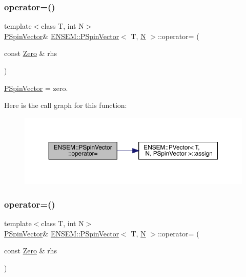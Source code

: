 \subsubsection{\texorpdfstring{operator=()}{operator=()}\hspace{0.1cm}{\footnotesize\ttfamily [1/6]}}
{\footnotesize\ttfamily template$<$class T, int N$>$ \\
\mbox{\hyperlink{classENSEM_1_1PSpinVector}{P\+Spin\+Vector}}\& \mbox{\hyperlink{classENSEM_1_1PSpinVector}{E\+N\+S\+E\+M\+::\+P\+Spin\+Vector}}$<$ T, \mbox{\hyperlink{adat__devel_2lib_2hadron_2operator__name__util_8cc_a7722c8ecbb62d99aee7ce68b1752f337}{N}} $>$\+::operator= (\begin{DoxyParamCaption}\item[{const \mbox{\hyperlink{structENSEM_1_1Zero}{Zero}} \&}]{rhs }\end{DoxyParamCaption})\hspace{0.3cm}{\ttfamily [inline]}}



\mbox{\hyperlink{classENSEM_1_1PSpinVector}{P\+Spin\+Vector}} = zero. 

Here is the call graph for this function\+:
\nopagebreak
\begin{figure}[H]
\begin{center}
\leavevmode
\includegraphics[width=350pt]{d0/dce/classENSEM_1_1PSpinVector_aff99857da5f6f68093f04c9df5355e84_cgraph}
\end{center}
\end{figure}
\mbox{\label{classENSEM_1_1PSpinVector_aff99857da5f6f68093f04c9df5355e84}} 
\subsubsection{\texorpdfstring{operator=()}{operator=()}\hspace{0.1cm}{\footnotesize\ttfamily [2/6]}}
{\footnotesize\ttfamily template$<$class T, int N$>$ \\
\mbox{\hyperlink{classENSEM_1_1PSpinVector}{P\+Spin\+Vector}}\& \mbox{\hyperlink{classENSEM_1_1PSpinVector}{E\+N\+S\+E\+M\+::\+P\+Spin\+Vector}}$<$ T, \mbox{\hyperlink{adat__devel_2lib_2hadron_2operator__name__util_8cc_a7722c8ecbb62d99aee7ce68b1752f337}{N}} $>$\+::operator= (\begin{DoxyParamCaption}\item[{const \mbox{\hyperlink{structENSEM_1_1Zero}{Zero}} \&}]{rhs }\end{DoxyParamCaption})\hspace{0.3cm}{\ttfamily [inline]}}



